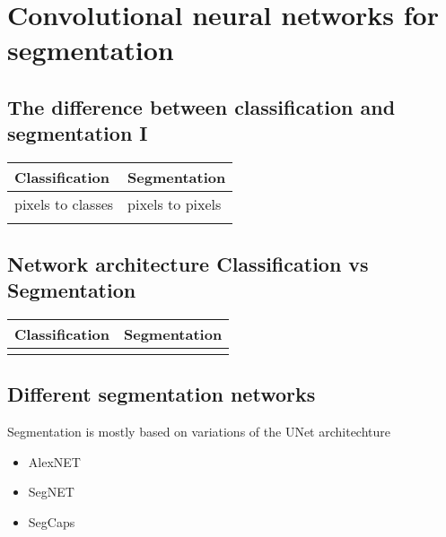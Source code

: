 \documentclass[letterpaper,10pt,english]{sphinxmanual}
\begin{document}
\chapter{Convolutional neural networks for segmentation}
\label{\detokenize{ML4NeutronImageSegmentation:convolutional-neural-networks-for-segmentation}}

\section{The difference between classification and segmentation I}
\label{\detokenize{ML4NeutronImageSegmentation:the-difference-between-classification-and-segmentation-i}}

\begin{savenotes}\sphinxattablestart
\centering
\begin{tabulary}{\linewidth}[t]{|T|T|}
\hline
\sphinxstyletheadfamily 
Classification
&\sphinxstyletheadfamily 
Segmentation
\\
\hline
pixels to classes
&
pixels to pixels
\\
\hline
{}
&
\\
\hline
\end{tabulary}
\par
\sphinxattableend\end{savenotes}


\section{Network architecture Classification vs Segmentation}
\label{\detokenize{ML4NeutronImageSegmentation:network-architecture-classification-vs-segmentation}}

\begin{savenotes}\sphinxattablestart
\centering
\begin{tabulary}{\linewidth}[t]{|T|T|}
\hline
\sphinxstyletheadfamily 
Classification
&\sphinxstyletheadfamily 
Segmentation
\\
\hline
{}
&
\\
\hline
\end{tabulary}
\par
\sphinxattableend\end{savenotes}


\section{Different segmentation networks}
\label{\detokenize{ML4NeutronImageSegmentation:different-segmentation-networks}}
Segmentation is mostly based on variations of the U\sphinxhyphen{}Net architechture
\begin{itemize}
\item {} 
AlexNET

\item {} 
SegNET

\item {} 
SegCaps

\end{itemize}
\end{document}
